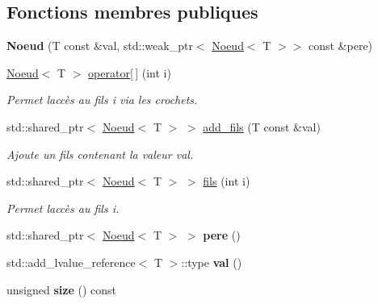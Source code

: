 \subsection*{Fonctions membres publiques}
\begin{DoxyCompactItemize}
\item 
{\bfseries Noeud} (T const \&val, std\+::weak\+\_\+ptr$<$ \hyperlink{classNoeud}{Noeud}$<$ T $>$$>$ const \&pere)\hypertarget{classNoeud_a1da54304cf1cb3ef8b185fddb392958a}{}\label{classNoeud_a1da54304cf1cb3ef8b185fddb392958a}

\item 
\hyperlink{classNoeud}{Noeud}$<$ T $>$ \hyperlink{classNoeud_ac15ebbd02aaff1c7ea6238617431e11f}{operator\mbox{[}$\,$\mbox{]}} (int i)\hypertarget{classNoeud_ac15ebbd02aaff1c7ea6238617431e11f}{}\label{classNoeud_ac15ebbd02aaff1c7ea6238617431e11f}

\begin{DoxyCompactList}\small\item\em Permet l\textquotesingle{}accès au fils i via les crochets. \end{DoxyCompactList}\item 
std\+::shared\+\_\+ptr$<$ \hyperlink{classNoeud}{Noeud}$<$ T $>$ $>$ \hyperlink{classNoeud_a6a494c4a2e3d844addfd3af6e65d527d}{add\+\_\+fils} (T const \&val)\hypertarget{classNoeud_a6a494c4a2e3d844addfd3af6e65d527d}{}\label{classNoeud_a6a494c4a2e3d844addfd3af6e65d527d}

\begin{DoxyCompactList}\small\item\em Ajoute un fils contenant la valeur val. \end{DoxyCompactList}\item 
std\+::shared\+\_\+ptr$<$ \hyperlink{classNoeud}{Noeud}$<$ T $>$ $>$ \hyperlink{classNoeud_ae968b7fe5d1c060ff61e8ab383a106b8}{fils} (int i)\hypertarget{classNoeud_ae968b7fe5d1c060ff61e8ab383a106b8}{}\label{classNoeud_ae968b7fe5d1c060ff61e8ab383a106b8}

\begin{DoxyCompactList}\small\item\em Permet l\textquotesingle{}accès au fils i. \end{DoxyCompactList}\item 
std\+::shared\+\_\+ptr$<$ \hyperlink{classNoeud}{Noeud}$<$ T $>$ $>$ {\bfseries pere} ()\hypertarget{classNoeud_a226193dbebac6cf5e8bd55bf47f6bf75}{}\label{classNoeud_a226193dbebac6cf5e8bd55bf47f6bf75}

\item 
std\+::add\+\_\+lvalue\+\_\+reference$<$ T $>$\+::type {\bfseries val} ()\hypertarget{classNoeud_a76f29413cf4c786bb1aa8be13aed2276}{}\label{classNoeud_a76f29413cf4c786bb1aa8be13aed2276}

\item 
unsigned {\bfseries size} () const \hypertarget{classNoeud_a8b1d01e51a0917ec172d57c2afa2f31c}{}\label{classNoeud_a8b1d01e51a0917ec172d57c2afa2f31c}

\end{DoxyCompactItemize}
